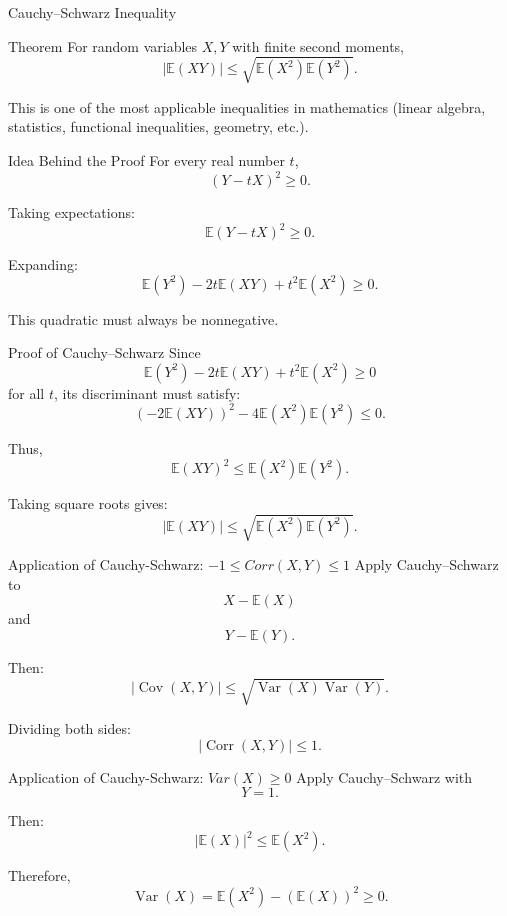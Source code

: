 
\begin{frame}{Cauchy--Schwarz Inequality}
\begin{keybox}{Theorem}
For random variables $X,Y$ with finite second moments,
\[
{
|\mathbb{E}(XY)|
\le
\sqrt{
\mathbb{E}(X^2)\mathbb{E}(Y^2)
}.
}
\]
\end{keybox}

\vspace{0.25cm}

This is one of the most applicable inequalities in mathematics (linear algebra, statistics, functional inequalities, geometry, etc.).
\end{frame}

\begin{frame}{Idea Behind the Proof}
For every real number $t$,
\[
(Y-tX)^2\ge0.
\]

Taking expectations:
\[
\mathbb{E}(Y-tX)^2\ge0.
\]

Expanding:
\[
\mathbb{E}(Y^2)
-2t\mathbb{E}(XY)
+t^2\mathbb{E}(X^2)
\ge0.
\]

\vspace{0.25cm}

This quadratic must always be nonnegative.
\end{frame}

\begin{frame}{Proof of Cauchy--Schwarz}
Since
\[
\mathbb{E}(Y^2)
-2t\mathbb{E}(XY)
+t^2\mathbb{E}(X^2)
\ge0
\]
for all $t$,
its discriminant must satisfy:
\[
(-2\mathbb{E}(XY))^2
-
4\mathbb{E}(X^2)\mathbb{E}(Y^2)
\le0.
\]

Thus,
\[
\mathbb{E}(XY)^2
\le
\mathbb{E}(X^2)\mathbb{E}(Y^2).
\]

Taking square roots gives:
\[
{
|\mathbb{E}(XY)|
\le
\sqrt{
\mathbb{E}(X^2)\mathbb{E}(Y^2)
}.
}
\]
\end{frame}

\begin{frame}{Application of Cauchy-Schwarz: $-1\leq Corr(X,Y)\leq 1$}
Apply Cauchy--Schwarz to
\[
X-\mathbb{E}(X)
\]
and
\[
Y-\mathbb{E}(Y).
\]

Then:
\[
|\operatorname{Cov}(X,Y)|
\le
\sqrt{
\operatorname{Var}(X)\operatorname{Var}(Y)
}.
\]

Dividing both sides:
\[
{
|\operatorname{Corr}(X,Y)|
\le1.
}
\]
\end{frame}

\begin{frame}{Application of Cauchy-Schwarz: $Var(X)\geq 0$}
Apply Cauchy--Schwarz with
\[
Y=1.
\]

Then:
\[
|\mathbb{E}(X)|^2
\le
\mathbb{E}(X^2).
\]

Therefore,
\[
\boxed{
\operatorname{Var}(X)
=
\mathbb{E}(X^2)-(\mathbb{E}(X))^2
\ge0.
}
\]
\end{frame}



